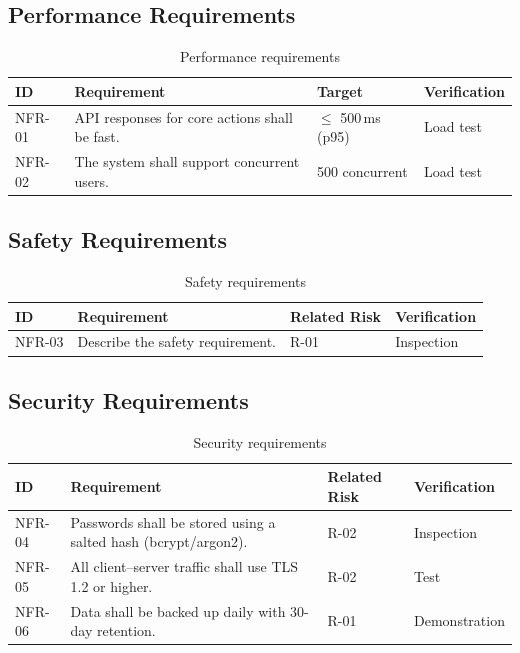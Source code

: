 \subsection{Performance Requirements}
\begin{table}[H]
\centering
\caption{Performance requirements}\label{tab:perf}
\begin{tabularx}{\textwidth}{|L{1.6cm}|X|L{3cm}|L{2.2cm}|}
\hline
{}\sffamily\bfseries ID & \sffamily\bfseries Requirement & \sffamily\bfseries Target & \sffamily\bfseries Verification \\ \hline
NFR-01 & API responses for core actions shall be fast. & $\leq$ 500\,ms (p95) & Load test \\ \hline
NFR-02 & The system shall support concurrent users. & 500 concurrent & Load test \\ \hline
\end{tabularx}
\end{table}

\subsection{Safety Requirements}
\begin{table}[H]
\centering
\caption{Safety requirements}\label{tab:safety}
\begin{tabularx}{\textwidth}{|L{1.6cm}|X|L{2.2cm}|L{2.2cm}|}
\hline
{}\sffamily\bfseries ID & \sffamily\bfseries Requirement & \sffamily\bfseries Related Risk & \sffamily\bfseries Verification \\ \hline
NFR-03 & Describe the safety requirement. & R-01 & Inspection \\ \hline
\end{tabularx}
\end{table}

\subsection{Security Requirements}
\begin{table}[H]
\centering
\caption{Security requirements}\label{tab:security}
\begin{tabularx}{\textwidth}{|L{1.6cm}|X|L{2.2cm}|L{2.2cm}|}
\hline
{}\sffamily\bfseries ID & \sffamily\bfseries Requirement & \sffamily\bfseries Related Risk & \sffamily\bfseries Verification \\ \hline
NFR-04 & Passwords shall be stored using a salted hash (bcrypt/argon2). & R-02 & Inspection \\ \hline
NFR-05 & All client--server traffic shall use TLS 1.2 or higher. & R-02 & Test \\ \hline
NFR-06 & Data shall be backed up daily with 30-day retention. & R-01 & Demonstration \\ \hline
\end{tabularx}
\end{table}

